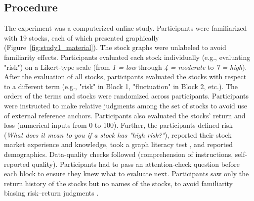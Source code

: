 \documentclass[a4paper,man, natbib,floatsintext]{apa6} %
\begin{document}
\subsection{Procedure} The experiment was a computerized online study. Participants were familiarized with 19 stocks, each of which presented graphically (Figure~\ref{fig:study1_material}). The stock graphs were unlabeled to avoid familiarity effects. Participants evaluated each stock individually (e.g., evaluating "risk") on a Likert-type scale (from \textit{1 = low} through \textit{4 = moderate} to \textit{7 = high}). After the evaluation of all stocks, participants evaluated the stocks with respect to a different term (e.g., "risk" in Block 1, "fluctuation" in Block 2, etc.). The orders of the terms and stocks were randomized across participants. Participants were instructed to make relative judgments among the set of stocks to avoid use of external reference anchors. Participants also evaluated the stocks' return and loss (numerical inputs from 0 to 100). Further, the participants defined risk (\textit{What does it mean to you if a stock has "high risk?"}), reported their stock market experience and knowledge, took a graph literacy test \citep{Garcia-Retamero2013a}, and reported demographics. Data-quality checks followed (comprehension of instructions, self-reported quality). Participants had to pass an attention-check question before each block to ensure they knew what to evaluate next. Participants saw only the return history of the stocks but no names of the stocks, to avoid familiarity biasing risk--return judgments \citep{Ganzach2000}.
\end{document}

